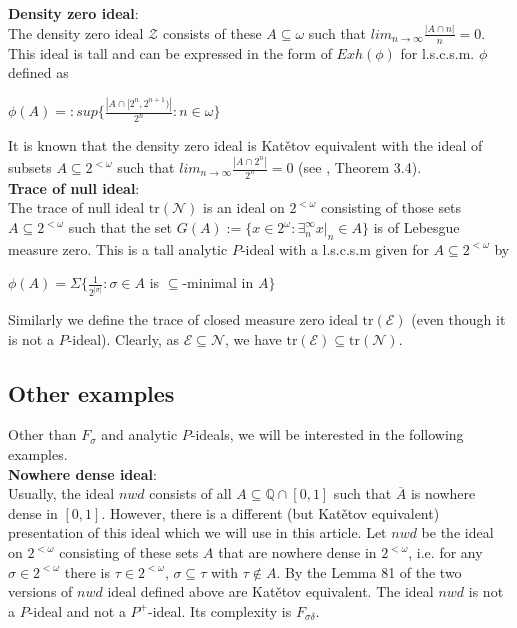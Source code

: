 \documentclass[a4paper]{amsart}
\newcommand{\existsinfty}{\exists^\infty}
\newcommand{\Null}{\mathcal{N}}
\newcommand{\E}{\mathcal{E}}
\newcommand{\Cantor}{2^{\omega}}
\newcommand{\cantor}{2^{<\omega}}
\newcommand{\nwd}{nwd}
\newcommand{\Z}{\mathcal{Z}}
\newcommand{\trN}{\mathrm{tr}(\Null)}
\newcommand{\trE}{\mathrm{tr}(\E)}
\begin{document}
\textbf{Density zero ideal}:\\
        The density zero ideal $\Z$ consists of these $A\subseteq\omega$ such that $lim_{n\to\infty}\frac{|A\cap n|}{n}=0$. This ideal is tall and can be expressed in the form of $Exh(\phi)$ for l.s.c.s.m. $\phi$ defined as
        \begin{center}
            $\phi(A)=:sup\{\frac{|A\cap [2^{n},2^{n+1})|}{2^{n}}:n\in\omega\}$
        \end{center}
        It is known that the density zero ideal is Katětov equivalent with the ideal of subsets $A\subseteq\cantor$ such that $lim_{n\to\infty}\frac{|A\cap 2^{n}|}{2^{n}}=0$ (see \cite{Hernand}, Theorem 3.4).\\
        
\textbf{Trace of null ideal}:\\
        The trace of null ideal $\trN$ is an ideal on $\cantor$ consisting of those sets $A\subseteq\cantor$ such that the set $G(A):=\{x\in\Cantor:\existsinfty_{n} x|_{n}\in A\}$ is of Lebesgue measure zero. This is a tall analytic $P$-ideal with a l.s.c.s.m given for $A\subseteq\cantor$ by
        \begin{center}
            $\phi(A)=\Sigma\{\frac{1}{2^{|\sigma|}}:\sigma\in A$ is $\subseteq$-minimal in $A\}$
        \end{center}
        Similarly we define the trace of closed measure zero ideal $\trE$ (even though it is not a $P$-ideal). Clearly, as $\E\subseteq\Null$, we have $\trE\subseteq\trN$.
        
\subsection{Other examples}
Other than $F_{\sigma}$ and analytic $P$-ideals, we will be interested in the following examples.\\

\textbf{Nowhere dense ideal}:\\
        Usually, the ideal $\nwd$ consists of all $A\subseteq\mathbb{Q}\cap[0,1]$ such that $\overline{A}$ is nowhere dense in $[0,1]$. However, there is a different (but Katětov equivalent) presentation of this ideal which we will use in this article. Let $\nwd$ be the ideal on $\cantor$ consisting of these sets $A$ that are nowhere dense in $\cantor$, i.e. for any $\sigma\in\cantor$ there is $\tau\in\cantor$, $\sigma\subseteq\tau$ with $\tau\notin A$. By the Lemma 81 of \cite{GuzmanPhd} the two versions of $\nwd$ ideal defined above are Katětov equivalent. The ideal $\nwd$ is not a $P$-ideal and not a $P^+$-ideal. Its complexity is $F_{\sigma\delta}$.\\
        
\end{document}

